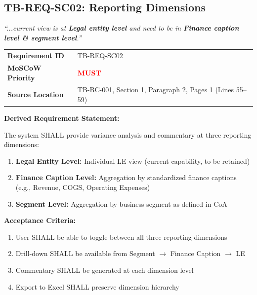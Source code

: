 \documentclass[11pt,a4paper,twoside]{report}
\begin{document}
\subsection{TB-REQ-SC02: Reporting Dimensions}
\label{req:tb-req-sc02}

\begin{tcolorbox}[colback=sourcegreen!5,colframe=sourcegreen!70,title=Source Quotation]
\textit{``...current view is at \textbf{Legal entity level} and need to be in
\textbf{Finance caption level \& segment level}.''}
\end{tcolorbox}

\begin{tabularx}{\textwidth}{@{}lX@{}}
\toprule
\textbf{Requirement ID} & TB-REQ-SC02 \\
\textbf{MoSCoW Priority} & \textcolor{red}{\textbf{MUST}} \\
\textbf{Source Location} & TB-BC-001, Section 1, Paragraph 2, Pages 1 (Lines 55--59) \\
\bottomrule
\end{tabularx}

\vspace{0.5em}
\textbf{Derived Requirement Statement:}

The system SHALL provide variance analysis and commentary at three reporting dimensions:

\begin{enumerate}[label=(\alph*)]
\item \textbf{Legal Entity Level:} Individual LE view (current capability, to be retained)
\item \textbf{Finance Caption Level:} Aggregation by standardized finance captions
(e.g., Revenue, COGS, Operating Expenses)
\item \textbf{Segment Level:} Aggregation by business segment as defined in CoA
\end{enumerate}

\textbf{Acceptance Criteria:}
\begin{enumerate}[label=AC-SC02-\arabic*:,leftmargin=*]
\item User SHALL be able to toggle between all three reporting dimensions
\item Drill-down SHALL be available from Segment $\rightarrow$ Finance Caption $\rightarrow$ LE
\item Commentary SHALL be generated at each dimension level
\item Export to Excel SHALL preserve dimension hierarchy
\end{enumerate}
\end{document}
